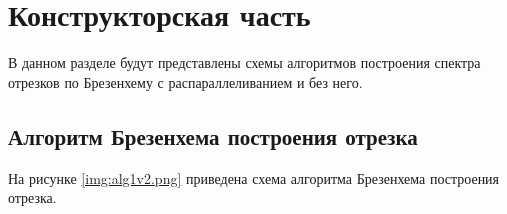 \chapter{Конструкторская часть}
В данном разделе будут представлены схемы алгоритмов построения спектра отрезков по Брезенхему с распараллеливанием и без него.
 

\section{Алгоритм Брезенхема построения отрезка}

На рисунке \ref{img:alg1v2.png} приведена схема алгоритма Брезенхема построения отрезка.
\\
\\
\\
\\
\\
\\
\\
\\
\\
\\
\\
\\
\\
\\
\\
\\
\\
\\
\\
\\
\\
\\



\FloatBarrier

